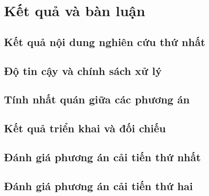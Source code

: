 \par{}
\section{Kết quả và bàn luận}\label{section:results-1}

\par{}
\subsection{Kết quả nội dung nghiên cứu thứ nhất}\label{subsection:results-2}

\par{}
\subsection{Độ tin cậy và chính sách xử lý}\label{subsection:results-3}

\par{}
\subsection{Tính nhất quán giữa các phương án}\label{subsection:results-4}

\par{}
\subsection{Kết quả triển khai và đối chiếu}\label{subsection:results-5}

\par{}
\subsection{Đánh giá phương án cải tiến thứ nhất}\label{subsection:results-6}

\par{}
\subsection{Đánh giá phương án cải tiến thứ hai}\label{subsection:results-7}

